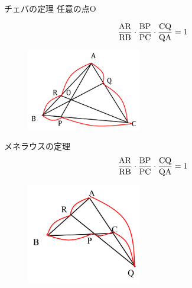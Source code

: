 \documentclass[aspectratio=169, 12pt]{beamer} %
\begin{document}
\begin{frame}{チェバの定理}
    任意の点O\par
    \begin{eqnarray*}
        \frac{\rm{AR}}{\rm{RB}}\cdot\frac{\rm{BP}}{\rm{PC}}\cdot\frac{\rm{CQ}}{\rm{QA}}=1
    \end{eqnarray*}
    \begin{figure}[htbp]
        \begin{center}
            \includegraphics[width=50mm]{fig/3.png}
        \end{center}
    \end{figure}
\end{frame}
\begin{frame}{メネラウスの定理}
    \begin{eqnarray*}
        \frac{\rm{AR}}{\rm{RB}}\cdot\frac{\rm{BP}}{\rm{PC}}\cdot\frac{\rm{CQ}}{\rm{QA}}=1
    \end{eqnarray*}
    \begin{figure}[htbp]
        \begin{center}
            \includegraphics[width=50mm]{fig/4.png}
        \end{center}
    \end{figure}
\end{frame}
\end{document}
